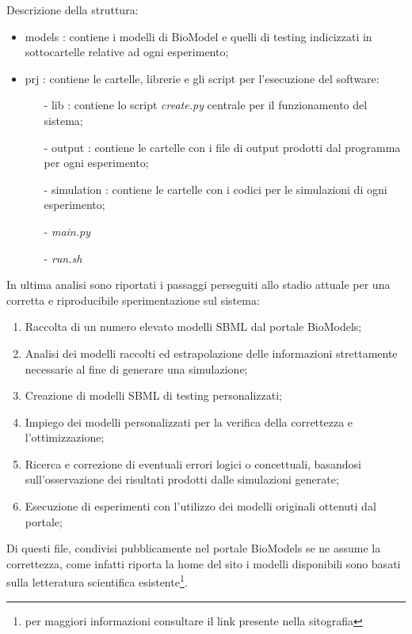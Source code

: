 \documentclass[Lau, oneside]{sapthesis}
\begin{document}
\noindent Descrizione della struttura:
\begin{itemize}
    \item models : contiene i modelli di BioModel e quelli di testing indicizzati in sottocartelle relative ad ogni esperimento; 
    \item prj : contiene le cartelle, librerie e gli script  per l'esecuzione del software: 
    \begin{itemize}
        \item[-] lib : contiene lo script \textit{create.py} centrale per il funzionamento del sistema;
        \item[-] output : contiene le cartelle con i file di output prodotti dal programma per ogni esperimento;
        \item[-] simulation : contiene le cartelle con i codici per le simulazioni di ogni esperimento;
        \item[-] \textit{main.py}
        \item[-] \textit{run.sh}
    \end{itemize}
\end{itemize}

In ultima analisi sono riportati i passaggi perseguiti allo stadio attuale per una corretta e riproducibile sperimentazione sul sistema:
\begin{enumerate}
    \item Raccolta di un numero elevato modelli SBML dal portale BioModels;
    \item Analisi dei modelli raccolti ed estrapolazione delle informazioni strettamente necessarie al fine di generare una simulazione;
    \item Creazione di modelli SBML di testing personalizzati;
    \item Impiego dei modelli personalizzati per la verifica della correttezza e l'ottimizzazione;
    \item Ricerca e correzione di eventuali errori logici o concettuali, basandosi sull'osservazione dei risultati prodotti dalle simulazioni generate;
    \item Esecuzione di esperimenti con l'utilizzo dei modelli originali ottenuti dal portale;
\end{enumerate}

Di questi file, condivisi pubblicamente nel portale BioModels se ne assume la correttezza, come infatti riporta la home del sito i modelli disponibili sono basati sulla letteratura scientifica esistente\footnote{per maggiori informazioni consultare il link presente nella sitografia}.
\end{document}
